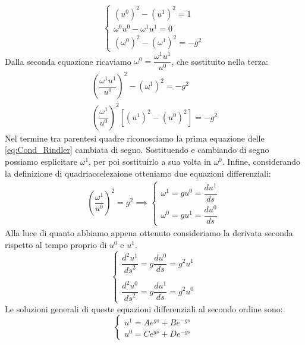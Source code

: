\begin{equation}\label{eq:Cond_Rindler}
    \begin{cases}
      (u^0)^2-(u^1)^2=1
             \\
     \omega^0u^0-\omega^1 u^1=0
              \\
     (\omega^0)^2-(\omega^1)^2=-g^2
    \end{cases}\,
\end{equation}
Dalla seconda equazione ricaviamo $\omega^0=\dfrac{\omega^1 u^1}{u^0}$, che sostituito nella terza:
\begin{gather*}
\left(\dfrac{\omega^1 u^1}{u^0}\right)^2-(\omega^1)^2=-g^2\\
\left(\dfrac{\omega^1}{u^0}\right)^2[(u^1)^2-(u^0)^2]=-g^2
    \end{gather*}
    Nel termine tra parentesi quadre riconosciamo la prima equazione delle \eqref{eq:Cond_Rindler} cambiata di segno. Sostituendo e cambiando di segno possiamo esplicitare $\omega^1$, per poi sostituirlo a sua volta in $\omega^0$. Infine, considerando la definizione di quadriaccelezaione otteniamo due equazioni differenziali:
    \begin{equation}\label{eq:Cond_Cost}
   \begin{gathered}
\left(\dfrac{\omega^1}{u^0}\right)^2=g^2 \implies
   \begin{cases}
      \omega^1=gu^0=\dfrac{du^1}{ds}
      \\
     \omega^0=gu^1=\dfrac{du^0}{ds}
      \end{cases}\, 
    \end{gathered} 
\end{equation}
Alla luce di quanto abbiamo appena ottenuto consideriamo la derivata seconda rispetto al tempo proprio di $u^0$ e $u^1$.
\begin{equation}
   \begin{cases}
    \dfrac{d^2u^1}{{ds}^2}=g\dfrac{du^0}{ds}=g^2u^1
      \\
      \\
    \dfrac{d^2u^0}{{ds}^2}=g\dfrac{du^1}{ds}=g^2u^0
      \end{cases}\, 
\end{equation}
Le soluzioni generali di queste equazioni differenziali al secondo ordine sono:
\begin{equation*}
   \begin{cases}
      u^1=Ae^{gs}+Be^{-gs}
      \\
     u^0=Ce^{gs}+De^{-gs}
      \end{cases}\, 
\end{equation*}
